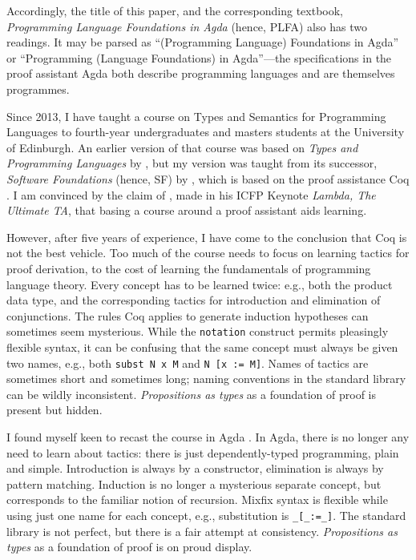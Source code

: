 \documentclass[runningheads]{llncs}
\begin{document}
Accordingly, the title of this paper, and the corresponding textbook,
\emph{Programming Language Foundations in Agda} (hence, PLFA)
also has two readings.  It may be parsed as ``(Programming Language)
Foundations in Agda'' or ``Programming (Language Foundations) in
Agda''---the specifications in the proof assistant Agda both describe
programming languages and are themselves programmes.

Since 2013, I have taught a course on Types and Semantics for
Programming Languages to fourth-year undergraduates and masters
students at the University of Edinburgh.  An earlier version of that
course was based on \emph{Types and Programming Languages} by
\citet{Pierce-2002}, but my version was taught from its successor,
\emph{Software Foundations} (hence, SF) by \citet{Pierce-et-al-2010},
which is based on the proof assistance Coq \citep{Huet-et-al-1997}.
I am convinced by the claim of \citet{Pierce-2009}, made in his ICFP
Keynote \emph{Lambda, The Ultimate TA}, that basing a course around a
proof assistant aids learning.

However, after five years of experience, I have come to the conclusion
that Coq is not the best vehicle.  Too much of the course needs to
focus on learning tactics for proof derivation, to the cost of
learning the fundamentals of programming language theory.  Every
concept has to be learned twice: e.g., both the product data type, and
the corresponding tactics for introduction and elimination of
conjunctions.  The rules Coq applies to generate induction hypotheses
can sometimes seem mysterious.  While the \texttt{notation} construct
permits pleasingly flexible syntax, it can be confusing that the same
concept must always be given two names, e.g., both
\texttt{subst~N~x~M} and \texttt{N~[x~:=~M]}.  Names of tactics are
sometimes short and sometimes long; naming conventions in the standard
library can be wildly inconsistent.  \emph{Propositions as types} as a
foundation of proof is present but hidden.

I found myself keen to recast the course in Agda \citep{Bove-et-al-2009}.
In Agda, there is
no longer any need to learn about tactics: there is just
dependently-typed programming, plain and simple. Introduction is
always by a constructor, elimination is always by pattern
matching. Induction is no longer a mysterious separate concept, but
corresponds to the familiar notion of recursion. Mixfix syntax is
flexible while using just one name for each concept, e.g.,
substitution is \texttt{\_[\_:=\_]}. The standard library is not perfect, but
there is a fair attempt at consistency. \emph{Propositions as types} as a
foundation of proof is on proud display.
\end{document}
